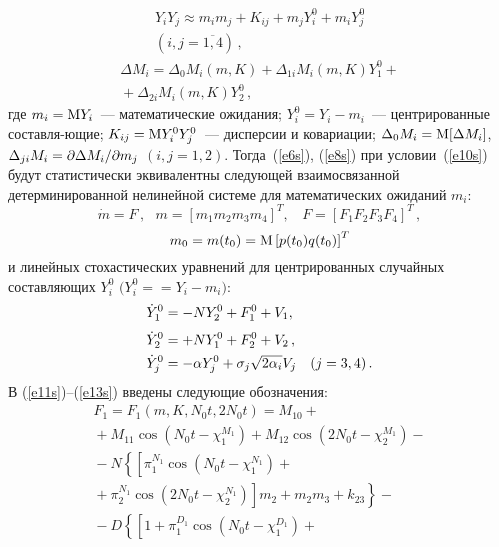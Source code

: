 \begin{multicols}{2}
\noindent
\begin{multline}
Y_iY_j \approx m_im_j + K_{ij} + m_j Y_i^0 + m_i Y_j^0\\
(i,j=\overline{1,4})\,,\label{e10s}
\end{multline}
\begin{multline*}
 \Delta M_i = \Delta_0 M_i (m,K) + \Delta_{1i}M_i (m,K)Y_1^0 +{}\\
{}+\Delta_{2i}M_i(m,K) Y_2^0\,,
\end{multline*}
где $m_i ={\rm M} Y_i$~--- математические ожидания;
$Y_i^0 = Y_i-m_i$~--- центрированные составля-\linebreak ющие;
$K_{ij} = {\rm M} Y_i^0 Y_j^0$~--- дисперсии и ковариации;
$\Delta_0 M_i={\rm M} [\Delta M_i]$,
$\Delta_{ji}M_i =\partial \Delta M_i/ \partial m_j$ $(i,j=1,2)$.
Тогда~(\ref{e6s}), (\ref{e8s}) при условии~(\ref{e10s})
будут статистически эквивалентны следующей
взаимосвязанной детерминированной нелинейной системе для
математических ожиданий $m_i$:
 $$\dot m = F\,,\ \ \ m = \left[ m_1 m_2 m_3 m_4\right]^T,\ \ \ \
 F= \left[ F_1 F_2 F_3 F_4\right]^T\,,$$
\begin{equation}
m_0 = m(t_0) ={\rm M} \left[ p(t_0) q(t_0)\right]^T\label{e11s}
\end{equation}
и линейных стохастических уравнений для центрированных случайных
составляющих $Y_{i}^0$ $(Y_{i}^0=$\linebreak $= Y_i -m_i)$:
\begin{align}
\dot Y_1^0 &= - NY_2^0 + F_1^0 + V_1, \notag\\[-6pt]
\label{e12s}\\[-6pt]
\dot Y_2^0 &= + NY_1^0 + F_2^0 + V_2\,, \notag\\
\dot Y_j^0 &= - \alpha Y_j^0 + \sigma_j \sqrt{2\alpha_i} V_j \quad (j=3,4)\,.\label{e13s}
\end{align}
В (\ref{e11s})--(\ref{e13s}) введены следующие обозначения:
\begin{multline*}
F_1 = F_1(m,K, N_0 t, 2 N_0t) = M_{10}+{}\\
{}+ M_{11} \cos \left( N_0 t -\chi_1^{M_1}\right)
 + M_{12}\cos \left( 2 N_0 t - \chi_2^{M_1}\right) -{}\\
{}- N\left\{ \left[ \!\pi_1^{N_1}
\cos \left( N_0 t -\chi_1^{N_1}\right)\right.\right.+{}\\
\left.\left.{} +\pi_2^{N_1} \cos \left( 2 N_0 t - \chi_2^{N_1}\right)\right]
m_2 + m_2m_3 + k_{23}\right\} -{}\\
{}- D \left\{ \left[ 1 + \pi_1^{D_1}
\cos \left( N_0 t -\chi_1^{D_1}\right)\right.\right.+{}\\

\end{multline*}
\end{multicols}

